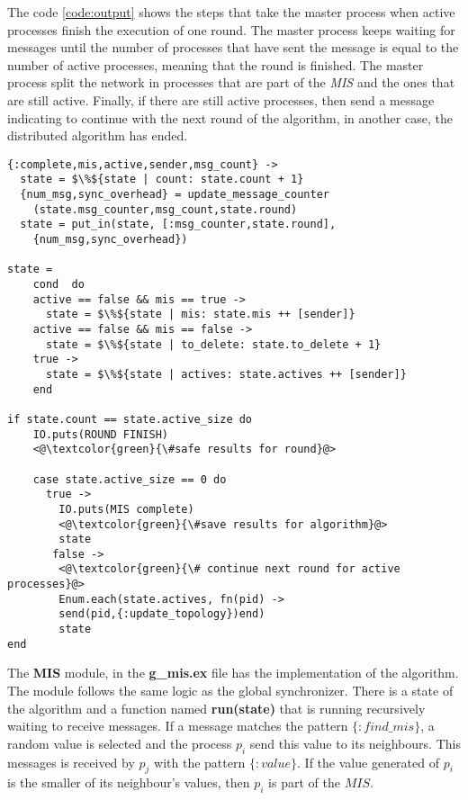The code \ref{code:output} shows the steps that take the master process when active processes finish the execution of one round. The master process keeps waiting for messages until the number of processes that have sent the message is equal to the number of active processes, meaning that the round is finished. The master process split the network in processes that are part of the \textit{MIS} and the ones that are still active.  Finally, if there are still active processes, then send a message indicating to continue with the next round of the algorithm, in another case, the distributed algorithm has ended.   
 
 
\begin{lstlisting}[frame=single, columns=fullflexible, mathescape=true, caption= Output of processes per round  , label = code:output]
{:complete,mis,active,sender,msg_count} ->
  state = $\%${state | count: state.count + 1}
  {num_msg,sync_overhead} = update_message_counter
    (state.msg_counter,msg_count,state.round)
  state = put_in(state, [:msg_counter,state.round],
    {num_msg,sync_overhead})

state =
    cond  do
    active == false && mis == true ->  
      state = $\%${state | mis: state.mis ++ [sender]}
    active == false && mis == false ->
      state = $\%${state | to_delete: state.to_delete + 1}
    true ->  
      state = $\%${state | actives: state.actives ++ [sender]}
    end

if state.count == state.active_size do
    IO.puts(ROUND FINISH)
    <@\textcolor{green}{\#safe results for round}@> 
    
    case state.active_size == 0 do
      true ->
        IO.puts(MIS complete)
        <@\textcolor{green}{\#save results for algorithm}@> 
        state
       false ->
        <@\textcolor{green}{\# continue next round for active processes}@> 
        Enum.each(state.actives, fn(pid) ->
        send(pid,{:update_topology})end)
        state
end
\end{lstlisting}


The \textbf{MIS} module, in the \textbf{g\_mis.ex} file has the implementation of the algorithm. The module follows the same logic as the global synchronizer. There is a state of the algorithm and a function named \textbf{run(state)} that is running recursively waiting to receive messages. If a message matches the pattern $\{:find\_mis\}$, a random value is selected and the process $p_i$ send this value to its neighbours. This messages is received by $p_j$ with the pattern $\{:value\}$. If the value generated of $p_i$ is the smaller of its neighbour's values, then $p_i$ is part of the $MIS$.  

